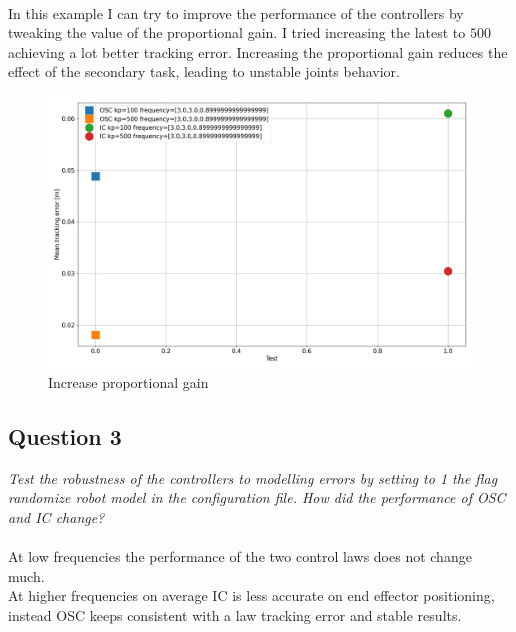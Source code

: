 \documentclass[12pt]{article}
\begin{document}
\paragraph*{}
In this example I can try to improve the performance of the controllers by tweaking the value of the proportional gain. I tried increasing the latest to \(500\) achieving a lot better tracking error.
Increasing the proportional gain reduces the effect of the secondary task, leading to unstable joints behavior.
\begin{figure}[h!]
    \centering
    \includegraphics[width=0.5\linewidth]{images/kp_500.png}
    \caption{Increase proportional gain}\label{fig:kp_increase}
\end{figure}

\subsection*{Question 3}
\textit{
    Test the robustness of the controllers to modelling errors by setting to 1 the flag randomize robot model in the configuration file.
    How did the performance of OSC and IC change?
}

\paragraph*{}
At low frequencies the performance of the two control laws does not change much.\\
At higher frequencies on average IC is less accurate on end effector positioning, instead OSC keeps consistent with a law tracking error and stable results.
 
\end{document}

